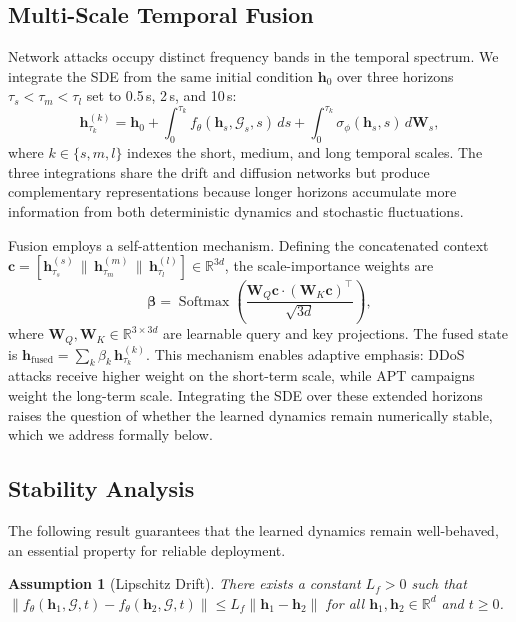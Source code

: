 \documentclass[journal]{IEEEtran}
\newcommand{\R}{\mathbb{R}}
\newcommand{\G}{\mathcal{G}}
\newcommand{\Softmax}{\operatorname{Softmax}}
\newtheorem{assumption}{Assumption}
\begin{document}
\subsection{Multi-Scale Temporal Fusion}

Network attacks occupy distinct frequency bands in the temporal spectrum. We integrate the SDE from the same initial condition $\mathbf{h}_0$ over three horizons $\tau_s < \tau_m < \tau_l$ set to 0.5\,s, 2\,s, and 10\,s:
\begin{equation}
\mathbf{h}_{\tau_k}^{(k)} = \mathbf{h}_0 + \int_0^{\tau_k}\! f_\theta(\mathbf{h}_s, \G_s, s)\,ds + \int_0^{\tau_k}\! \sigma_\phi(\mathbf{h}_s, s)\,d\mathbf{W}_s,
\label{eq:multiscale}
\end{equation}
where $k \in \{s, m, l\}$ indexes the short, medium, and long temporal scales. The three integrations share the drift and diffusion networks but produce complementary representations because longer horizons accumulate more information from both deterministic dynamics and stochastic fluctuations.

Fusion employs a self-attention mechanism. Defining the concatenated context $\mathbf{c} = [\mathbf{h}_{\tau_s}^{(s)} \,\|\, \mathbf{h}_{\tau_m}^{(m)} \,\|\, \mathbf{h}_{\tau_l}^{(l)}] \in \R^{3d}$, the scale-importance weights are
\begin{equation}
\boldsymbol{\beta} = \Softmax\!\left(\frac{\mathbf{W}_Q \mathbf{c} \cdot (\mathbf{W}_K \mathbf{c})^\top}{\sqrt{3d}}\right),
\label{eq:attention_weights}
\end{equation}
where $\mathbf{W}_Q, \mathbf{W}_K \in \R^{3 \times 3d}$ are learnable query and key projections. The fused state is $\mathbf{h}_{\mathrm{fused}} = \sum_{k} \beta_k \, \mathbf{h}_{\tau_k}^{(k)}$. This mechanism enables adaptive emphasis: DDoS attacks receive higher weight on the short-term scale, while APT campaigns weight the long-term scale. Integrating the SDE over these extended horizons raises the question of whether the learned dynamics remain numerically stable, which we address formally below.


\subsection{Stability Analysis}

The following result guarantees that the learned dynamics remain well-behaved, an essential property for reliable deployment.

\begin{assumption}[Lipschitz Drift]
\label{ass:lipschitz}
There exists a constant $L_f > 0$ such that $\|f_\theta(\mathbf{h}_1, \G, t) - f_\theta(\mathbf{h}_2, \G, t)\| \le L_f \|\mathbf{h}_1 - \mathbf{h}_2\|$ for all $\mathbf{h}_1, \mathbf{h}_2 \in \R^d$ and $t \ge 0$.
\end{assumption}
\end{document}
